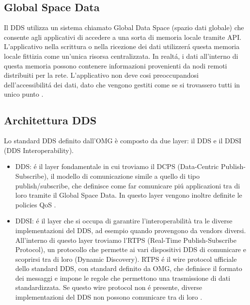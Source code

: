 \subsection{Global Space Data}
Il DDS utilizza un sistema chiamato Global Data 
Space (spazio dati globale) che consente agli applicativi
di accedere a una sorta di memoria locale tramite API.
L'applicativo nella scrittura o nella ricezione dei dati utilizzerá 
questa memoria locale fittizia come un'unica risorsa centralizzata.
In realtá, i dati all'interno di questa memoria possono contenere
informazioni provenienti da nodi remoti distribuiti per la rete. 
L'applicativo non deve cosi preoccupandosi dell'accessibilitá dei dati,
dato che vengono gestiti come se si trovassero tutti in unico punto \cite{whatisdds}.


\subsection{Architettura DDS}
Lo standard DDS definito dall'OMG è composto da due layer: 
il DDS e il
DDSI (DDS Interoperability).
    \begin{itemize}
        \item DDS: é il layer fondamentale in cui troviamo il DCPS
        (Data-Centric Publish-Subscribe),
        il modello di comunicazione simile a quello di tipo publish/subscribe,
        che definisce come far comunicare piú applicazioni tra di loro tramite
        il Global Space Data. In questo layer vengono inoltre 
        definite le policies QoS \cite{Michaud2017Apr}.
        \item DDSI: é il layer che si occupa di garantire l'interoperabilità
        tra le diverse implementazioni del DDS, ad
        esempio quando provengono da vendors diversi.
        All'interno di questo layer troviamo l'RTPS 
        (Real-Time Publish-Subscribe Protocol), un protocollo che permette ai 
        vari dispositivi DDS di comunicare e scoprirsi tra di loro
        (Dynamic Discovery).
        RTPS é il wire protocol ufficiale dello standard DDS, 
        con standard definito da OMG,
        che definisce il formato dei messaggi e impone le regole che 
        permettono una trasmissione di dati standardizzata. 
        Se questo wire protocol non é presente,
        diverse implementazioni del DDS non possono 
        comunicare tra di loro \cite{essay93639}.
    \end{itemize} 







